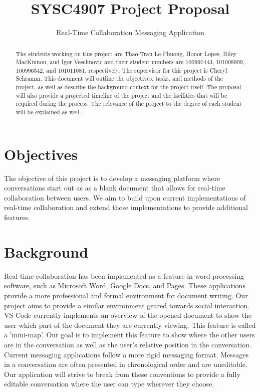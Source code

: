 \documentclass[11pt,letterpaper]{report}
\begin{document}
	\title{SYSC4907 Project Proposal}
	\author{Real-Time Collaboration Messaging Application}
	\date{}
	\maketitle

	\begin{abstract}
		The students working on this project are Thao-Tran Le-Phuong, Honor Lopes, Riley MacKinnon, and Igor Veselinovic and their
		student numbers are 100997443, 101008909, 100996542, and 101011081,
		respectively. The supervisor for this project is Cheryl Schramm. This
		document will outline the objectives, tasks, and methods of the
		project, as well as describe the background context for the project
		itself. The proposal will also provide a projected timeline of the
		project and the facilities that will be required during the process.
		The relevance of the project to the degree of each student will be
		explained as well.
	\end{abstract}

	\tableofcontents

	\pagebreak

	\section*{Objectives}
	\markright{}
	The objective of this project is to develop a messaging platform where
	conversations start out as as a blank document that allows for real-time
	collaboration between users. We aim to build upon current implementations
	of real-time collaboration and extend those implementations to provide
	additional features.

	\section*{Background}
	\markright{}
	Real-time collaboration has been implemented as a feature in word
	processing software, such as Microsoft Word, Google Docs, and Pages. These
	applications provide a more professional and formal environment for
	document writing. Our project aims to provide a similar environment geared
	towards social interaction. VS Code currently implements an overview of the
	opened document to show the user which part of the document they are
	currently viewing. This feature is called a 'mini-map'. Our goal is to
	implement this feature to show where the other users are in the
	conversation as well as the user's relative position in the conversation.
	Current messaging applications follow a more rigid messaging format.
	Messages in a conversation are often presented in chronological order and 
	are uneditable. Our application will strive to break from these conventions
	to provide a fully editable conversation where the user can type wherever
	they choose.
\end{document}
